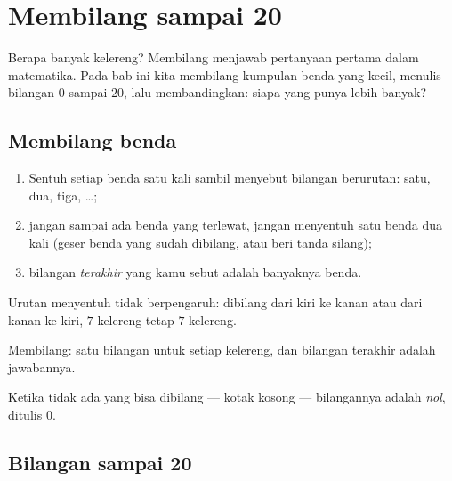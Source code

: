 \chapter{Membilang sampai 20}\label{ch:g1:counting}

Berapa banyak kelereng? Membilang menjawab pertanyaan pertama dalam
matematika. Pada bab ini kita membilang kumpulan benda yang kecil,
menulis bilangan $0$ sampai $20$, lalu membandingkan: siapa yang punya
lebih banyak?

\section{Membilang benda}

\begin{method}\label{met:g1:counting:how}
\begin{enumerate}
  \item Sentuh setiap benda satu kali sambil menyebut bilangan
        berurutan: satu, dua, tiga, \dots;
  \item jangan sampai ada benda yang terlewat, jangan menyentuh satu
        benda dua kali (geser benda yang sudah dibilang, atau beri
        tanda silang);
  \item bilangan \emph{terakhir} yang kamu sebut adalah banyaknya
        benda.
\end{enumerate}
Urutan menyentuh tidak berpengaruh: dibilang dari kiri ke kanan atau
dari kanan ke kiri, $7$ kelereng tetap $7$ kelereng.
\end{method}

\begin{omfigure}

{\small Membilang: satu bilangan untuk setiap kelereng, dan bilangan
terakhir adalah jawabannya.}
\end{omfigure}

\begin{definition}[Nol]\label{def:g1:counting:zero}
Ketika tidak ada yang bisa dibilang --- kotak kosong --- bilangannya
adalah \emph{nol}, ditulis $0$.
\end{definition}

\section{Bilangan sampai 20}

